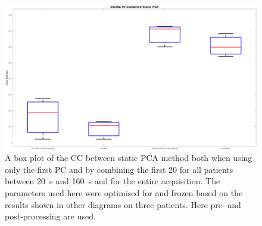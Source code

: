             \begin{figure}
                \centering
                
                \includegraphics[width=1.0\linewidth]{figures/data_driven_surrogate_signal_extraction_results_1_box_plot_processed.png}
                
                \captionsetup{singlelinecheck=false, justification=centering}
                \caption{A box plot of the \gls{CC} between static \gls{PCA} method both when using only the first \gls{PC} and by combining the first $20$  for all patients between \SI{20}{\second} and \SI{160}{\second} and for the entire acquisition. The parameters used here were optimised for and frozen based on the results shown in other diagrams on three patients. Here pre- and post-processing are used.}
                \label{fig:pca_data_driven_surrogate_signal_extraction_methods_for_dynamic_pet_results_box_plot_processed}
            \end{figure}
            
